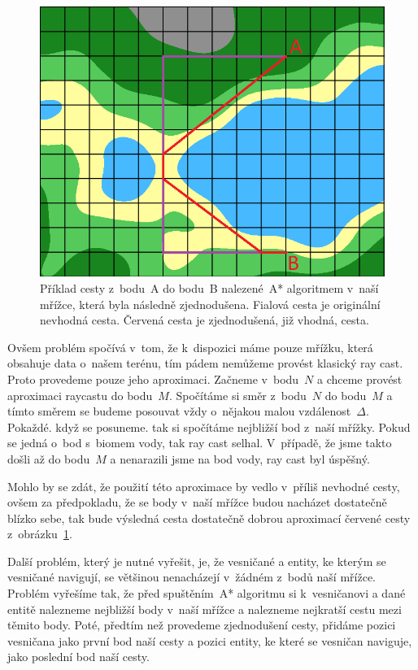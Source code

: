 \begin{figure}[!htb]
    \centering
    \includegraphics[width=0.66\linewidth]{img/path_simplified.png}
    \caption{Příklad cesty z~bodu~A do bodu~B nalezené~A* algoritmem v~naší mřížce, která byla následně zjednodušena. Fialová cesta je originální nevhodná cesta. Červená cesta je zjednodušená, již vhodná, cesta.}
    \label{fig:path_simplified}
\end{figure}

Ovšem problém spočívá v~tom, že k~dispozici máme pouze mřížku, která obsahuje data o~našem terénu, tím pádem nemůžeme provést klasický ray cast. Proto provedeme pouze jeho aproximaci. Začneme v~bodu~$N$ a chceme provést aproximaci raycastu do bodu~$M$. Spočítáme si směr z~bodu~$N$ do bodu~$M$ a tímto směrem se budeme posouvat vždy o~nějakou malou vzdálenost~$\Delta$. Pokaždé. když se posuneme. tak si spočítáme nejbližší bod z~naší mřížky. Pokud se jedná o~bod s~biomem vody, tak ray cast selhal. V~případě, že jsme takto došli až do bodu~$M$ a nenarazili jsme na bod vody, ray cast byl úspěšný.

Mohlo by se zdát, že použití této aproximace by vedlo v~příliš nevhodné cesty, ovšem za předpokladu, že se body v~naší mřížce budou nacházet dostatečně blízko sebe, tak bude výsledná cesta dostatečně dobrou aproximací červené cesty z~obrázku~\ref{fig:path_simplified}.

Další problém, který je nutné vyřešit, je, že vesničané a entity, ke kterým se vesničané navigují, se většinou nenacházejí v~žádném z~bodů naší mřížce. Problém vyřešíme tak, že před spuštěním~A* algoritmu si k~vesničanovi a dané entitě nalezneme nejbližší body v~naší mřížce a nalezneme nejkratší cestu mezi těmito body. Poté, předtím než provedeme zjednodušení cesty, přidáme pozici vesničana jako první bod naší cesty a pozici entity, ke které se vesničan naviguje, jako poslední bod naší cesty.

